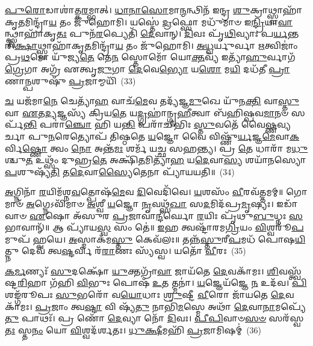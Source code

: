 \-\ul{𑌪𑍁}\-\-\ul{𑌰𑍋}\-𑌡𑌾𑌶𑌾॑𑌤𑍍𑌕\-\ul{𑌰}\-𑌮𑍍𑌭𑌾𑌤𑍍। \ul{𑌧𑌾}\-\-\ul{𑌨𑌾}\-\-\ul{𑌸𑍋}\-𑌮𑌾\-\ul{𑌨𑍍𑌮}\-𑌨𑍍𑌥𑌿𑌨᳴ 𑌇𑌨𑍍𑌦𑍍𑌰 \ul{𑌶𑍁}\-𑌕𑍍𑌰𑌾𑌥𑍍𑌸𑍍𑌵𑌾𑌹𑌾᳴𑌕𑍃\-\ul{𑌤}\-𑌮𑌿𑌨𑍍𑌦𑍍𑌰𑌾᳴\-\ul{𑌯} 𑌤𑌂 𑌜𑍁᳴𑌹𑍋𑌮𑌿। 𑌯𑌸𑍍𑌤𑍇॑ \ul{𑌦𑍍𑌰}\-𑌫𑍍𑌸𑍋 𑌮𑌧𑍁᳴𑌮𑌾𑍞 𑌇\-\ul{𑌨𑍍𑌦𑍍𑌰𑌿}\-𑌯𑌾\-\ul{𑌵𑌾}\-𑌨𑍍𑌥𑍍𑌸𑍍𑌵𑌾𑌹𑌾᳴𑌕𑍃\-\ul{𑌤𑌃} 𑌪𑍁𑌨᳴\-\ul{𑌰}\-𑌪𑍍𑌯𑍇𑌤𑌿᳴ \ul{𑌦𑍇}\-𑌵𑌾𑌨𑍍। \ul{𑌦𑌿}\-𑌵𑌃 𑌪𑍃᳴\-\ul{𑌥𑌿}\-𑌵𑍍𑌯𑌾𑌃 𑌪\-\ul{𑌰𑍍𑌯}\-𑌨𑍍𑌤𑌰𑌿᳴\-\ul{𑌕𑍍𑌷𑌾}\-𑌥𑍍𑌸𑍍𑌵𑌾𑌹𑌾᳴𑌕𑍃\-\ul{𑌤}\-𑌮𑌿𑌨𑍍𑌦𑍍𑌰𑌾᳴\-\ul{𑌯} 𑌤𑌂 𑌜𑍁᳴𑌹𑍋𑌮𑌿। \ul{𑌅}\-\-\ul{𑌧𑍍𑌵}\-𑌰𑍍𑌯𑍁𑌰𑍍𑌵𑌾 \ul{𑌋}\-𑌤𑍍𑌵𑌿𑌜𑌾𑌂॑ 𑌪𑍍𑌰\-\ul{𑌥}\-𑌮𑍋 𑌯𑍁᳴𑌜𑍍𑌯\-\ul{𑌤𑍇} 𑌤𑍇\-\ul{𑌨} 𑌸𑍍𑌤𑍋𑌮𑍋᳴ 𑌯𑍋\-\ul{𑌕𑍍𑌤}\-𑌵𑍍𑌯᳴ 𑌇𑌤𑍍𑌯𑌾᳴\-\ul{𑌹𑍁}\-𑌰𑍍𑌵𑌾𑌗᳴\-\ul{𑌗𑍍𑌰𑍇}\-𑌗𑌾 𑌅𑌗𑍍𑌰᳴ 𑌏𑌤𑍍𑌵𑍃\-\ul{𑌜𑍁}\-𑌗𑌾 \ul{𑌦𑍇}\-𑌵𑍇\-\ul{𑌭𑍍𑌯𑍋} 𑌯\-\ul{𑌶𑍋} 𑌮\-\ul{𑌯𑌿} 𑌦𑌧᳴𑌤𑍀 \ul{𑌪𑍍𑌰𑌾}\-𑌣𑌾\-\ul{𑌨𑍍𑌪}\-𑌶𑍁𑌷𑍁᳴ \ul{𑌪𑍍𑌰}\-𑌜𑌾𑌮𑍍𑌮𑌯𑌿᳴~(33)

\-\ul{𑌚} 𑌯𑌜᳴𑌮𑌾\-\ul{𑌨𑍇} 𑌚𑍇𑌤𑍍𑌯𑌾᳴\-\ul{𑌹} 𑌵𑌾𑌚᳴\-\ul{𑌮𑍇}\-𑌵 𑌤𑌦𑍍𑌯᳴𑌜𑍍𑌞\-\ul{𑌮𑍁}\-𑌖𑍇 𑌯𑍁᳴𑌨\-\ul{𑌕𑍍𑌤𑌿} 𑌵𑌾\-\ul{𑌸𑍍𑌤𑍁} 𑌵𑌾 \ul{𑌏}\-𑌤\-\ul{𑌦𑍍𑌯}\-𑌜𑍍𑌞𑌸𑍍𑌯᳴ 𑌕𑍍𑌰𑌿𑌯\-\ul{𑌤𑍇} 𑌯\-\ul{𑌦𑍍𑌗𑍍𑌰}\-𑌹𑌾॑𑌨𑍍𑌗𑍃\-\ul{𑌹𑍀}\-𑌤𑍍𑌵𑌾 𑌬᳴𑌹𑌿𑌷𑍍𑌪𑌵\-\ul{𑌮𑌾}\-𑌨𑍞 𑌸𑌰𑍍𑌪᳴\-\ul{𑌨𑍍𑌤𑌿} 𑌪𑌰𑌾॑\-\ul{𑌞𑍍𑌚𑍋} 𑌹𑌿 𑌯\-\ul{𑌨𑍍𑌤𑌿} 𑌪𑌰𑌾᳴𑌚𑍀𑌭𑌿𑌃 \ul{𑌸𑍍𑌤𑍁}\-𑌵𑌤𑍇᳴ 𑌵𑍈\-\ul{𑌷𑍍𑌣}\-𑌵𑍍𑌯𑌰𑍍𑌚𑌾 𑌪𑍁\-\ul{𑌨}\-𑌰𑍇𑌤𑍍𑌯𑍋𑌪᳴ 𑌤𑌿𑌷𑍍𑌠𑌤𑍇 \ul{𑌯}\-𑌜𑍍𑌞𑍋 𑌵𑍈 𑌵𑌿𑌷𑍍𑌣𑍁᳴\-\ul{𑌰𑍍𑌯}\-𑌜𑍍𑌞\-\ul{𑌮𑍇}\-𑌵𑌾\-\ul{𑌕}\-𑌰𑍍𑌵𑌿\-\ul{𑌷𑍍𑌣𑍋} 𑌤𑍍𑌵𑌂 \ul{𑌨𑍋} 𑌅𑌨𑍍𑌤᳴\-\ul{𑌮𑌃} 𑌶𑌰𑍍𑌮᳴ 𑌯𑌚𑍍𑌛 𑌸𑌹𑌨𑍍𑌤𑍍𑌯। 𑌪𑍍𑌰 \ul{𑌤𑍇} 𑌧𑌾𑌰𑌾᳴ 𑌮\-\ul{𑌧𑍁}\-𑌶𑍍𑌚𑍁\-\ul{𑌤} 𑌉𑌥𑍍𑌸𑌂᳴ 𑌦𑍁𑌹𑍍𑌰\-\ul{𑌤𑍇} 𑌅𑌕𑍍𑌷𑌿᳴\-\ul{𑌤}\-𑌮𑌿𑌤𑍍𑌯𑌾᳴\-\ul{𑌹} 𑌯\-\ul{𑌦𑍇}\-𑌵𑌾\-\ul{𑌸𑍍𑌯} 𑌶𑌯𑌾᳴𑌨𑌸𑍍𑌯𑍋\-\ul{𑌪}\-𑌶𑍁𑌷𑍍𑌯᳴\-\ul{𑌤𑌿} 𑌤\-\ul{𑌦𑍇}\-𑌵𑌾\-\ul{𑌸𑍍𑌯𑍈}\-𑌤𑍇𑌨𑌾 𑌪𑍍𑌯𑌾᳴𑌯𑌯𑌤𑌿॥~(34)

{\anuvakamend[{\-\ul{𑌪}\-\-\ul{𑌰𑌿}\-\-\ul{𑌵𑌾}\-𑌪𑌾\-\ul{𑌤𑍍𑌪𑍍𑌰}\-𑌜𑌾𑌂 𑌮𑌯𑌿᳴ 𑌦𑍁𑌹𑍍𑌰\-\ul{𑌤𑍇} 𑌚𑌤𑍁᳴𑌰𑍍𑌦𑌶 𑌚}]}%

\-\ul{𑌅}\-𑌗𑍍𑌨𑌿𑌨𑌾᳴ \ul{𑌰}\-𑌯𑌿𑌮᳴𑌶𑍍𑌨\-\ul{𑌵}\-𑌤𑍍𑌪𑍋𑌷᳴\-\ul{𑌮𑍇}\-𑌵 \ul{𑌦𑌿}\-𑌵𑍇𑌦𑌿᳴𑌵𑍇। \ul{𑌯}\-𑌶𑌸𑌂᳴ \ul{𑌵𑍀}\-𑌰𑌵᳴𑌤𑍍𑌤𑌮𑌮𑍍॥ 𑌗𑍋𑌮𑌾𑍞᳴ \ul{𑌅}\-𑌗𑍍𑌨𑍇\-𑌽𑌵𑌿᳴𑌮𑌾𑍞 \ul{𑌅}\-𑌶𑍍𑌵𑍀 \ul{𑌯}\-𑌜𑍍𑌞𑍋 \ul{𑌨𑍃}\-𑌵𑌥𑍍𑌸᳴\-\ul{𑌖𑌾} 𑌸\-\ul{𑌦}\-𑌮𑌿𑌦᳴𑌪𑍍𑌰\-\ul{𑌮𑍃}\-𑌷𑍍𑌯𑌃। 𑌇𑌡𑌾᳴𑌵𑌾𑍞 \ul{𑌏}\-𑌷𑍋 𑌅᳴𑌸𑍁𑌰 \ul{𑌪𑍍𑌰}\-𑌜𑌾𑌵𑌾॑\-\ul{𑌨𑍍𑌦𑍀}\-𑌰𑍍𑌘𑍋 \ul{𑌰}\-𑌯𑌿𑌃 𑌪𑍃᳴𑌥𑍁\-\ul{𑌬𑍁}\-𑌧𑍍𑌨𑌃 \ul{𑌸}\-𑌭𑌾𑌵𑌾𑌨𑍍᳴॥ 𑌆 𑌪𑍍𑌯𑌾᳴𑌯\-\ul{𑌸𑍍𑌵} 𑌸𑌂 𑌤𑍇॑॥ \ul{𑌇}\-𑌹 𑌤𑍍𑌵𑌷𑍍𑌟𑌾᳴𑌰𑌮\-\ul{𑌗𑍍𑌰𑌿}\-𑌯𑌂 \ul{𑌵𑌿}\-𑌶𑍍𑌵𑌰𑍂᳴\-\ul{𑌪}\-𑌮𑍁𑌪᳴ 𑌹𑍍𑌵𑌯𑍇। \ul{𑌅}\-𑌸𑍍𑌮𑌾𑌕᳴𑌮\-\ul{𑌸𑍍𑌤𑍁} 𑌕𑍇𑌵᳴𑌲𑌃॥ 𑌤𑌨𑍍𑌨᳴\-\ul{𑌸𑍍𑌤𑍁}\-𑌰𑍀\-\ul{𑌪}\-𑌮𑌧᳴ 𑌪𑍋𑌷\-\ul{𑌯𑌿}\-𑌤𑍍𑌨𑍁 𑌦𑍇𑌵᳴ 𑌤𑍍𑌵\-\ul{𑌷𑍍𑌟}\-𑌰𑍍𑌵𑌿 𑌰᳴\-\ul{𑌰𑌾}\-𑌣𑌃 𑌸𑍍𑌯᳴𑌸𑍍𑌵। 𑌯𑌤𑍋᳴ \ul{𑌵𑍀}\-𑌰𑌃~(35)

\-\ul{𑌕}\-\-\ul{𑌰𑍍𑌮}\-𑌣𑍍𑌯𑌃᳴ \ul{𑌸𑍁}\-𑌦𑌕𑍍𑌷𑍋᳴ \ul{𑌯𑍁}\-𑌕𑍍𑌤𑌗𑍍𑌰𑌾᳴\-\ul{𑌵𑌾} 𑌜𑌾𑌯᳴𑌤𑍇 \ul{𑌦𑍇}\-𑌵𑌕𑌾᳴𑌮𑌃। \ul{𑌶𑌿}\-𑌵𑌸𑍍𑌤𑍍𑌵᳴𑌷𑍍𑌟\-\ul{𑌰𑌿}\-𑌹𑌾 𑌗᳴𑌹𑌿 \ul{𑌵𑌿}\-𑌭𑍁𑌃 𑌪𑍋𑌷᳴ \ul{𑌉}\-𑌤 𑌤𑍍𑌮𑌨𑌾॑। \ul{𑌯}\-𑌜𑍍𑌞𑍇𑌯᳴𑌜𑍍𑌞𑍇 \ul{𑌨} 𑌉𑌦᳴𑌵। \ul{𑌪𑌿}\-𑌶𑌙𑍍𑌗᳴𑌰𑍂𑌪𑌃 \ul{𑌸𑍁}\-𑌭𑌰𑍋᳴ 𑌵\-\ul{𑌯𑍋}\-𑌧𑌾𑌃 \ul{𑌶𑍍𑌰𑍁}\-𑌷𑍍𑌟𑍀 \ul{𑌵𑍀}\-𑌰𑍋 𑌜𑌾᳴𑌯𑌤𑍇 \ul{𑌦𑍇}\-𑌵𑌕𑌾᳴𑌮𑌃। \ul{𑌪𑍍𑌰}\-𑌜𑌾𑌂 𑌤𑍍𑌵\-\ul{𑌷𑍍𑌟𑌾} 𑌵𑌿 𑌷𑍍𑌯᳴\-\ul{𑌤𑍁} 𑌨𑌾𑌭𑌿᳴\-\ul{𑌮}\-𑌸𑍍𑌮𑍇 𑌅𑌥𑌾᳴ \ul{𑌦𑍇}\-𑌵𑌾\-\ul{𑌨𑌾}\-𑌮𑌪𑍍𑌯𑍇᳴\-\ul{𑌤𑍁} 𑌪𑌾𑌥𑌃᳴। 𑌪𑍍𑌰 𑌣𑍋᳴ \ul{𑌦𑍇}\-𑌵𑍍𑌯𑌾 𑌨𑍋᳴ \ul{𑌦𑌿}\-𑌵𑌃। \ul{𑌪𑍀}\-\-\ul{𑌪𑌿}\-𑌵𑌾𑍞\-\ul{𑌸}\-\-\ul{𑍞} 𑌸𑌰᳴𑌸𑍍𑌵\-\ul{𑌤𑌃} 𑌸𑍍𑌤\-\ul{𑌨𑌂} 𑌯𑍋 \ul{𑌵𑌿}\-𑌶𑍍𑌵𑌦᳴𑌰𑍍𑌶𑌤𑌃। \ul{𑌧𑍁}\-\-\ul{𑌕𑍍𑌷𑍀}\-𑌮𑌹𑌿᳴ \ul{𑌪𑍍𑌰}\-𑌜𑌾𑌮𑌿𑌷𑌮𑍍॑~(36)

